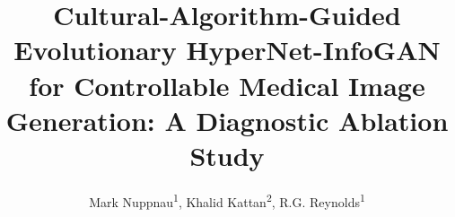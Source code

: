 \documentclass[letterpaper]{article} %
\title{Cultural-Algorithm-Guided Evolutionary HyperNet-InfoGAN for Controllable Medical Image Generation: A Diagnostic Ablation Study}
\author{
    Mark Nuppnau\textsuperscript{\rm 1},
    Khalid Kattan\textsuperscript{\rm 2},
    R.G. Reynolds\textsuperscript{\rm 1}\\
}
\begin{document}
\renewcommand{\bottomfraction}{0.5}
\maketitle

\begin{abstract}
\end{abstract}

\end{document}
